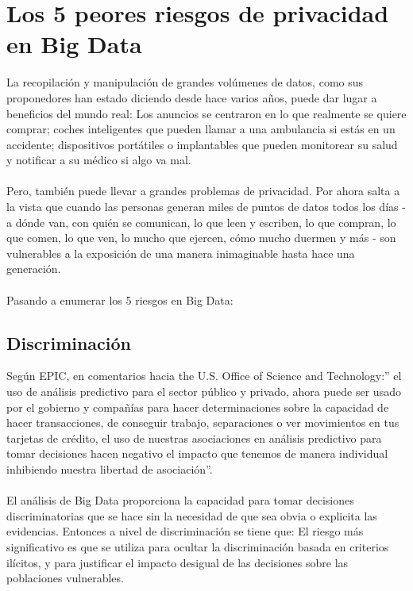\documentclass[journal]{IEEEtran}
\begin{document}
\section{Los 5 peores riesgos de privacidad en Big Data}
La recopilación y manipulación de grandes volúmenes de datos, como sus proponedores han estado diciendo desde hace varios años, puede dar lugar a beneficios del mundo real: Los anuncios se centraron en lo que realmente se quiere comprar; coches inteligentes que pueden llamar a una ambulancia si estás en un accidente; dispositivos portátiles o implantables que pueden monitorear su salud y notificar a su médico si algo va mal.\\ \\
Pero, también puede llevar a grandes problemas de privacidad. Por ahora salta a la vista que cuando las personas generan miles de puntos de datos todos los días - a dónde van, con quién se comunican, lo que leen y escriben, lo que compran, lo que comen, lo que ven, lo mucho que ejercen, cómo mucho duermen y más - son vulnerables a la exposición de una manera inimaginable hasta hace una generación.\\ \\
Pasando a enumerar los 5 riesgos en Big Data:

\subsection{Discriminación}
Según EPIC, en comentarios hacia the U.S. Office of Science and Technology:” el uso de análisis predictivo para el sector público y privado, ahora puede ser usado por el gobierno y compañías para hacer determinaciones sobre la capacidad de hacer transacciones, de conseguir trabajo, separaciones o ver movimientos en tus tarjetas de crédito, el uso de nuestras asociaciones en análisis predictivo para tomar decisiones hacen negativo el impacto que tenemos de manera individual inhibiendo nuestra libertad de asociación”.\\ \\
El análisis de Big Data proporciona la capacidad para tomar decisiones discriminatorias que se hace sin la necesidad de que sea obvia o explicita las evidencias. Entonces a nivel de discriminación se tiene que: El riesgo más significativo es que se utiliza para ocultar la discriminación basada en criterios ilícitos, y para justificar el impacto desigual de las decisiones sobre las poblaciones vulnerables.
\end{document}
